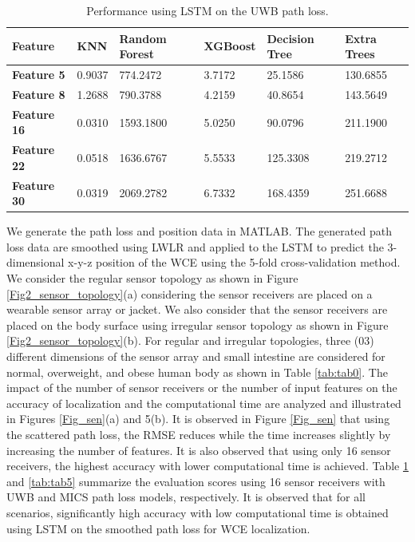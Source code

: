 \documentclass{IEEE_lsens}
\begin{document}
\begin{table}[t!]
\centering
\caption{\scriptsize Performance using LSTM on the UWB path loss.}\label{tab:tab4}
\vspace{-0.2cm}
\begin{tabular}{|m{0.7677598in}|m{0.49135986in}|m{1.0830599in}|m{0.66565984in}|m{0.9497598in}|m{0.8309598in}|}
\hline
{\bfseries Feature} &
{\bfseries KNN} &
{\bfseries Random Forest} &
{\bfseries XGBoost} &
{\bfseries Decision Tree} &
{\bfseries Extra Trees}\\\hline
{\bfseries Feature 5} &
0.9037 &
774.2472 &
3.7172 &
25.1586 &
130.6855\\\hline
{\bfseries Feature 8} &
1.2688 &
790.3788 &
4.2159 &
40.8654 &
143.5649\\\hline
{\bfseries Feature 16} &
0.0310 &
1593.1800 &
5.0250 &
90.0796 &
211.1900\\\hline
{\bfseries Feature 22} &
0.0518 &
1636.6767 &
5.5533 &
125.3308 &
219.2712\\\hline
{\bfseries Feature 30} &
0.0319 &
2069.2782 &
6.7332 &
168.4359 &
251.6688\\\hline
\end{tabular}
\end{table}
We generate the path loss and position data in MATLAB. The generated path loss data are smoothed using LWLR and applied to the LSTM to predict the 3-dimensional x-y-z position of the WCE using the 5-fold cross-validation method. We consider the regular sensor topology as shown in Figure \ref{Fig2_sensor_topology}(a) considering the sensor receivers are placed on a wearable sensor array or jacket. We also consider that the sensor receivers are placed on the body surface using irregular sensor topology as shown in Figure \ref{Fig2_sensor_topology}(b). For regular and irregular topologies, three (03) different dimensions of the sensor array and small intestine are considered for normal, overweight, and obese human body as shown in Table \ref{tab:tab0}. The impact of the number of sensor receivers or the number of input features on the accuracy of localization and the computational time are analyzed and illustrated in Figures \ref{Fig_sen}(a) and 5(b). It is observed in Figure \ref{Fig_sen} that using the scattered path loss, the RMSE reduces while the time increases slightly by increasing the number of features. It is also observed that using only 16 sensor receivers, the highest accuracy with lower computational time is achieved. Table \ref{tab:tab4} and \ref{tab:tab5} summarize the evaluation scores using 16 sensor receivers with UWB and MICS path loss models, respectively. It is observed that for all scenarios, significantly high accuracy with low computational time is obtained using LSTM on the smoothed path loss for WCE localization.
\end{document}

